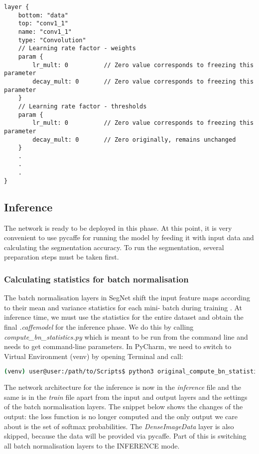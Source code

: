 \begin{lstlisting}[caption={Setting up \textit{train.prototxt} for transfer learning \cite{filip_github}},captionpos=b]
layer {
	bottom: "data"
	top: "conv1_1"
	name: "conv1_1"
	type: "Convolution"
	// Learning rate factor - weights
	param {
		lr_mult: 0			// Zero value corresponds to freezing this parameter
		decay_mult: 0		// Zero value corresponds to freezing this parameter
	}
	// Learning rate factor - thresholds
	param {
		lr_mult: 0			// Zero value corresponds to freezing this parameter
		decay_mult: 0		// Zero originally, remains unchanged
	}
	.
	.
	.
}
\end{lstlisting}


\newpage
\subsection{Inference}

The network is ready to be deployed in this phase. At this point, it is very convenient to use pycaffe for running the model by feeding it with input data and calculating the segmentation accuracy. To run the segmentation, several preparation steps must be taken first.

\subsubsection{Calculating statistics for batch normalisation}
The batch normalisation layers in SegNet shift the input feature maps according to their mean and variance statistics for each mini- batch during training \cite{mehlig}. At inference time, we must use the statistics for the entire dataset and obtain the final \textit{.caffemodel} for the inference phase. \cite{segnet_get_started} We do this by calling \textit{compute\_bn\_statistics.py} which is meant to be run from the command line and needs to get command-line parameters. In PyCharm, we need to switch to Virtual Environment (venv) by opening Terminal and call:

\begin{lstlisting}[language=bash]
(venv) user@user:/path/to/Scripts$ python3 original_compute_bn_statistics.py /path/to/train.prototxt /path/to/snap_iter_XY.caffemodel /path/to/inference_folder
\end{lstlisting}

The network architecture for the inference is now in the \textit{inference} file and the same is in the \textit{train} file apart from the input and output layers and the settings of the batch normalisation layers. The snippet below shows the changes of the output: the loss function is no longer computed and the only output we care about is the set of softmax probabilities. The \textit{DenseImageData} layer is also skipped, because the data will be provided via pycaffe. Part of this is switching all batch normalisation layers to the INFERENCE mode. \cite{issue}

